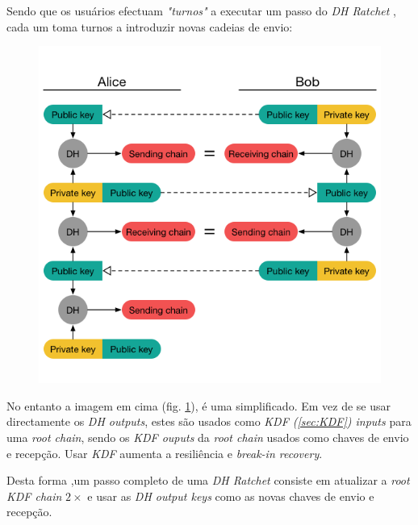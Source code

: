 Sendo que os usuários efectuam \textit{"turnos"} a executar um passo do \textit{DH Ratchet} , cada um toma turnos a introduzir novas cadeias de envio:

\begin{figure}[H]
\begin{center}
\includegraphics[width=12cm]{img/DH6.png}
\caption{}
\label{diagram:DH6}
\centering
\end{center}
\end{figure}

No entanto a imagem em cima (fig. \ref{diagram:DH6}), é uma simplificado. Em vez de se usar directamente os \textit{DH outputs}, estes são usados como \textit{KDF (\ref{sec:KDF}) inputs} para uma \textit{root chain}, sendo os \textit{KDF ouputs} da \textit{root chain} usados como chaves de envio e recepção. Usar \textit{KDF} aumenta a resiliência e \textit{break-in recovery}.

Desta forma ,um passo completo de uma \textit{DH Ratchet} consiste em atualizar a \textit{root KDF chain} $2\times$ e usar as \textit{DH output keys} como as novas chaves de envio e recepção.


